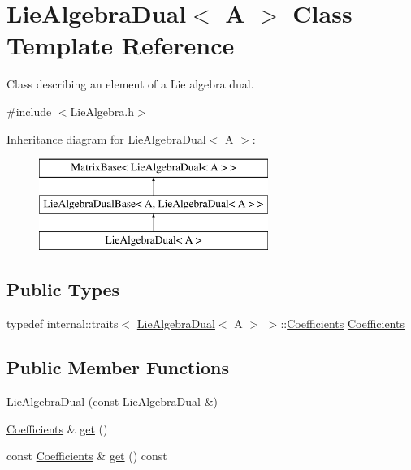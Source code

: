 \hypertarget{class_lie_algebra_dual}{}\section{Lie\+Algebra\+Dual$<$ A $>$ Class Template Reference}
\label{class_lie_algebra_dual}


Class describing an element of a Lie algebra dual.  




{\ttfamily \#include $<$Lie\+Algebra.\+h$>$}

Inheritance diagram for Lie\+Algebra\+Dual$<$ A $>$\+:\begin{figure}[H]
\begin{center}
\leavevmode
\includegraphics[height=3.000000cm]{class_lie_algebra_dual}
\end{center}
\end{figure}
\subsection*{Public Types}
\begin{DoxyCompactItemize}
\item 
typedef internal\+::traits$<$ \hyperlink{class_lie_algebra_dual}{Lie\+Algebra\+Dual}$<$ A $>$ $>$\+::\hyperlink{class_lie_algebra_dual_a82710c51eb4d0b6cbd190e76a33fbc17}{Coefficients} \hyperlink{class_lie_algebra_dual_a82710c51eb4d0b6cbd190e76a33fbc17}{Coefficients}
\end{DoxyCompactItemize}
\subsection*{Public Member Functions}
\begin{DoxyCompactItemize}
\item 
\hyperlink{class_lie_algebra_dual_a7895f043d19eeee0aba750b83b45da7e}{Lie\+Algebra\+Dual} (const \hyperlink{class_lie_algebra_dual}{Lie\+Algebra\+Dual} \&)
\item 
\hyperlink{class_lie_algebra_dual_a82710c51eb4d0b6cbd190e76a33fbc17}{Coefficients} \& \hyperlink{class_lie_algebra_dual_a9e03668378642cf1147226aa6925a76d}{get} ()
\item 
const \hyperlink{class_lie_algebra_dual_a82710c51eb4d0b6cbd190e76a33fbc17}{Coefficients} \& \hyperlink{class_lie_algebra_dual_aa0fb0278ce57f0ec91b71b849d8e1f3c}{get} () const
\end{DoxyCompactItemize}
